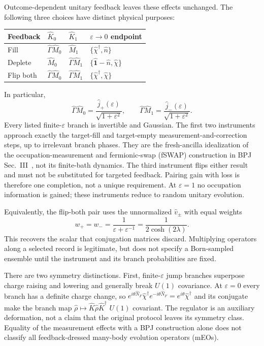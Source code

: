 \documentclass[aps,prb,onecolumn,nofootinbib,superscriptaddress]{revtex4-2}
\newcommand{\One}{\hat{\mathbf{1}}}
\newcommand{\eps}{\varepsilon}
\begin{document}
Outcome-dependent unitary feedback leaves these effects unchanged. The
following three choices have distinct physical purposes:
\begin{center}
\begin{tabular}{llll}
\toprule
Feedback & $\hat K_0$ & $\hat K_1$ & $\eps\to0$ endpoint\\
\midrule
Fill & $\hat\Gamma\hat M_0$ & $\hat M_1$
 & $\{\hat\chi^\dagger,\hat n\}$\\
Deplete & $\hat M_0$ & $\hat\Gamma\hat M_1$
 & $\{\One-\hat n,\hat\chi\}$\\
Flip both & $\hat\Gamma\hat M_0$ & $\hat\Gamma\hat M_1$
 & $\{\hat\chi^\dagger,\hat\chi\}$\\
\bottomrule
\end{tabular}
\end{center}
In particular,
\begin{equation}
 \hat\Gamma\hat M_0=\frac{\hat j_+(\eps)}{\sqrt{1+\eps^2}},\qquad
 \hat\Gamma\hat M_1=\frac{\hat j_-(\eps)}{\sqrt{1+\eps^2}}.
 \label{eq:normalized-jumps}
\end{equation}
Every listed finite-$\eps$ branch is invertible and Gaussian. The first
two instruments approach exactly the target-fill and target-empty
measurement-and-correction steps, up to irrelevant branch phases. They
are the fresh-ancilla idealization of the occupation-measurement and
fermionic-swap (fSWAP) construction
in BPJ Sec.~III~\cite{BhuiyanPanJian2026}, not its finite-bath dynamics.
The third instrument flips either result and must not be substituted for
targeted feedback. Pairing gain with loss is therefore one completion,
not a unique requirement. At $\eps=1$ no occupation information is gained;
these instruments reduce to random unitary evolution.

Equivalently, the flip-both pair uses the unnormalized $\hat v_\pm$ with
equal weights
\begin{equation}
 w_+=w_-=\frac1{\eps+\eps^{-1}}=\frac1{2\cosh(2\lambda)}.
\end{equation}
This recovers the scalar that conjugation matrices discard. Multiplying
operators along a selected record is legitimate, but does not specify a
Born-sampled ensemble until the instrument and its branch probabilities
are fixed.

There are two symmetry distinctions. First, finite-$\eps$ jump branches
superpose charge raising and lowering and generally break $U(1)$
covariance. At $\eps=0$ every branch has a definite charge change, so
$e^{i\theta\hat N_F}\hat\chi^{\dagger}e^{-i\theta\hat N_F}
=e^{i\theta}\hat\chi^\dagger$ and its conjugate make the branch map
$\hat\rho\mapsto\hat K\hat\rho\hat K^\dagger$ $U(1)$ covariant.
The regulator is an auxiliary deformation, not a claim that the original
protocol leaves its symmetry class. Equality of the measurement effects
with a BPJ construction alone does not classify all feedback-dressed
many-body evolution operators (mEOs).
\end{document}
